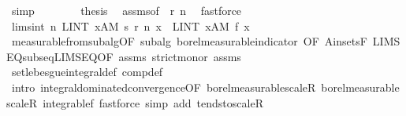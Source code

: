 \begin{isabellebody}
\ simp\isanewline
\ \ \ \ \ \ \isamarkupfalse%
\ {\isacharquery}{\kern0pt}thesis\ \isamarkupfalse%
\ assms{\isacharparenleft}{\kern0pt}{}{\isacharparenright}{\kern0pt}{\isacharbrackleft}{\kern0pt}of\ {\isacharunderscore}{\kern0pt}\ {\isachardoublequoteopen}r\ n{\isachardoublequoteclose}{\isacharbrackright}{\kern0pt}\ \isamarkupfalse%
\ fastforce\isanewline
\ \ \ \ \isamarkupfalse%
\isanewline
\ \ \ \ \isamarkupfalse%
\ lim{\isacharunderscore}{\kern0pt}s{\isacharunderscore}{\kern0pt}int{\isacharcolon}{\kern0pt}\ {\isachardoublequoteopen}{\isacharparenleft}{\kern0pt}{\isasymlambda}n{\isachardot}{\kern0pt}\ LINT\ x{\isacharcolon}{\kern0pt}A{\isacharbar}{\kern0pt}M{\isachardot}{\kern0pt}\ s\ {\isacharparenleft}{\kern0pt}r\ n{\isacharparenright}{\kern0pt}\ x{\isacharparenright}{\kern0pt}\ {\isasymlonglonglongrightarrow}\ LINT\ x{\isacharcolon}{\kern0pt}A{\isacharbar}{\kern0pt}M{\isachardot}{\kern0pt}\ f\ x{\isachardoublequoteclose}\isanewline
\ \ \ \ \ \ \isamarkupfalse%
\ measurable{\isacharunderscore}{\kern0pt}from{\isacharunderscore}{\kern0pt}subalg{\isacharbrackleft}{\kern0pt}OF\ subalg\ borel{\isacharunderscore}{\kern0pt}measurable{\isacharunderscore}{\kern0pt}indicator{\isacharcomma}{\kern0pt}\ OF\ A{\isacharunderscore}{\kern0pt}in{\isacharunderscore}{\kern0pt}sets{\isacharunderscore}{\kern0pt}F{\isacharbrackright}{\kern0pt}\ LIMSEQ{\isacharunderscore}{\kern0pt}subseq{\isacharunderscore}{\kern0pt}LIMSEQ{\isacharbrackleft}{\kern0pt}OF\ assms{\isacharparenleft}{\kern0pt}{}{\isacharparenright}{\kern0pt}\ strict{\isacharunderscore}{\kern0pt}mono{\isacharunderscore}{\kern0pt}r{\isacharbrackright}{\kern0pt}\ assms{\isacharparenleft}{\kern0pt}{}{\isacharparenright}{\kern0pt}\isanewline
\ \ \ \ \ \ \isamarkupfalse%
\ set{\isacharunderscore}{\kern0pt}lebesgue{\isacharunderscore}{\kern0pt}integral{\isacharunderscore}{\kern0pt}def\ comp{\isacharunderscore}{\kern0pt}def\isanewline
\ \ \ \ \ \ \isamarkupfalse%
\ {\isacharparenleft}{\kern0pt}intro\ integral{\isacharunderscore}{\kern0pt}dominated{\isacharunderscore}{\kern0pt}convergence{\isacharbrackleft}{\kern0pt}OF\ borel{\isacharunderscore}{\kern0pt}measurable{\isacharunderscore}{\kern0pt}scaleR\ borel{\isacharunderscore}{\kern0pt}measurable{\isacharunderscore}{\kern0pt}scaleR\ integrable{\isacharunderscore}{\kern0pt}{}f{\isacharbrackright}{\kern0pt}{\isacharparenright}{\kern0pt}\ {\isacharparenleft}{\kern0pt}fastforce\ simp\ add{\isacharcolon}{\kern0pt}\ tendsto{\isacharunderscore}{\kern0pt}scaleR{\isacharparenright}{\kern0pt}{\isacharplus}{\kern0pt}\isanewline

\end{isabellebody}
